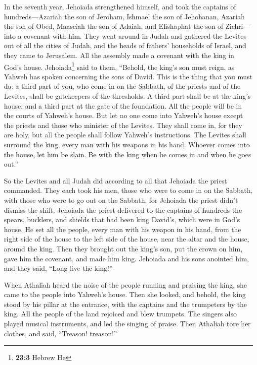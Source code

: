  In the seventh year, Jehoiada strengthened himself, and
took the captains of hundreds---Azariah the son of Jeroham, Ishmael the
son of Jehohanan, Azariah the son of Obed, Maaseiah the son of Adaiah,
and Elishaphat the son of Zichri---into a covenant with him.
 They went around in Judah and gathered the Levites out of
all the cities of Judah, and the heads of fathers' households of Israel,
and they came to Jerusalem.  All the assembly made a
covenant with the king in God's house. Jehoiada\footnote{\textbf{23:3}
  Hebrew He} said to them, ``Behold, the king's son must reign, as
Yahweh has spoken concerning the sons of David.  This is
the thing that you must do: a third part of you, who come in on the
Sabbath, of the priests and of the Levites, shall be gatekeepers of the
thresholds.  A third part shall be at the king's house;
and a third part at the gate of the foundation. All the people will be
in the courts of Yahweh's house.  But let no one come into
Yahweh's house except the priests and those who minister of the Levites.
They shall come in, for they are holy, but all the people shall follow
Yahweh's instructions.  The Levites shall surround the
king, every man with his weapons in his hand. Whoever comes into the
house, let him be slain. Be with the king when he comes in and when he
goes out.''

 So the Levites and all Judah did according to all that
Jehoiada the priest commanded. They each took his men, those who were to
come in on the Sabbath, with those who were to go out on the Sabbath,
for Jehoiada the priest didn't dismiss the shift. 
Jehoiada the priest delivered to the captains of hundreds the spears,
bucklers, and shields that had been king David's, which were in God's
house.  He set all the people, every man with his weapon
in his hand, from the right side of the house to the left side of the
house, near the altar and the house, around the king. 
Then they brought out the king's son, put the crown on him, gave him the
covenant, and made him king. Jehoiada and his sons anointed him, and
they said, ``Long live the king!''

 When Athaliah heard the noise of the people running and
praising the king, she came to the people into Yahweh's house.
 Then she looked, and behold, the king stood by his
pillar at the entrance, with the captains and the trumpeters by the
king. All the people of the land rejoiced and blew trumpets. The singers
also played musical instruments, and led the singing of praise. Then
Athaliah tore her clothes, and said, ``Treason! treason!''

